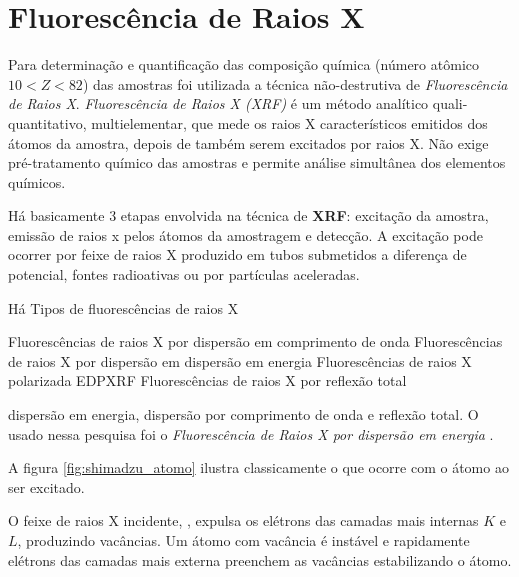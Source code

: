 \section{Fluorescência de Raios X}

Para determinação e quantificação das composição química (número atômico $ 10 < Z < 82$)
das amostras foi utilizada a técnica não-destrutiva de \textit{Fluorescência de Raios X}.
\textit{Fluorescência de Raios X (XRF)} é um método analítico quali-quantitativo, 
multielementar, que mede os raios X característicos emitidos dos átomos da amostra, 
depois de também serem excitados por raios X. Não exige pré-tratamento químico
das amostras e permite análise simultânea dos elementos químicos.

Há basicamente 3 etapas envolvida na técnica de \textbf{XRF}: 
excitação da amostra, emissão de raios x pelos átomos da amostragem
e detecção. A excitação pode ocorrer por feixe de raios X produzido em 
tubos submetidos a diferença de potencial, fontes radioativas 
ou por partículas aceleradas. 

Há Tipos de fluorescências de raios X

Fluorescências de raios X por dispersão em comprimento de onda
Fluorescências de raios X por dispersão em dispersão em energia
Fluorescências de raios X polarizada EDPXRF
Fluorescências de raios X por reflexão total

 dispersão em energia,
dispersão por comprimento de onda e reflexão total.
O usado nessa pesquisa foi o 
\textit{Fluorescência de Raios X por dispersão em energia} \citep{jenkins1988}.

A figura \ref{fig:shimadzu_atomo} ilustra classicamente o que ocorre com
o átomo ao ser excitado.


O feixe de raios X incidente, , expulsa os elétrons das camadas mais 
internas $K$ e $L$, produzindo vacâncias. 
Um átomo com vacância é instável e rapidamente elétrons das camadas 
mais externa preenchem as vacâncias estabilizando o átomo.

